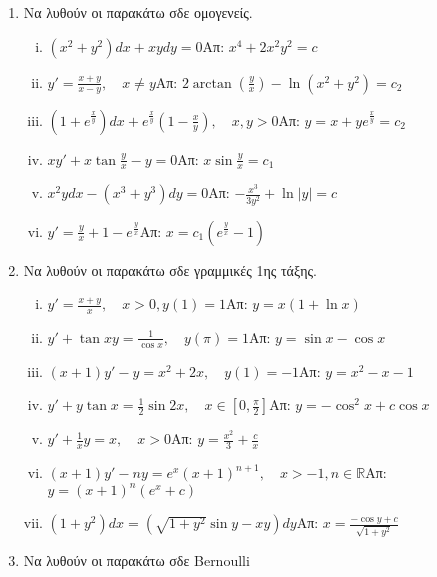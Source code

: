 \documentclass[a4paper,12pt]{article}
\begin{document}
\begin{enumerate}
\begin{enumerate}[i)]
\end{enumerate}


\item Να λυθούν οι παρακάτω σδε ομογενείς.

\begin{enumerate}[i)]

\item $(x^2+y^2)dx+xydy=0$\hfill Απ: $x^4+2x^2y^2=c$
\item $y'=\frac{x+y}{x-y}, \quad x\neq y$\hfill Απ: $2\arctan (\frac{y}{x})-\ln (x^2+y^2)=c_2$
\item $(1+e^{\frac{x}{y}})dx+e^{\frac{x}{y}}(1-\frac{x}{y}), \quad x,y>0$\hfill Απ: $y=x+ye^{\frac{x}{y}}=c_2$
\item $xy'+x\tan \frac{y}{x}-y=0$\hfill Απ: $x\sin \frac{y}{x}=c_1$
\item $x^2ydx-(x^3+y^3)dy=0$\hfill Απ: $-\frac{x^3}{3y^2}+\ln|y|=c$
\item $y'=\frac{y}{x}+1-e^{\frac{y}{x}}$\hfill Απ: $x=c_1(e^{\frac{y}{x}}-1)$

\end{enumerate}

\item Να λυθούν οι παρακάτω σδε γραμμικές 1ης τάξης.

\begin{enumerate}[i)]

\item $y'=\frac{x+y}{x}, \quad x>0, y(1)=1$\hfill Απ: $y=x(1+\ln x)$
\item $y'+\tan x y=\frac{1}{\cos x}, \quad y(\pi)=1$\hfill Απ: $y=\sin x-\cos x$
\item $(x+1)y'-y=x^2+2x, \quad y(1)=-1$\hfill Απ: $y=x^2-x-1$
\item $y'+y\tan x=\frac{1}{2}\sin 2x, \quad x\in [0,\frac{\pi}{2}]$\hfill Απ: $y=-\cos^2 x+c\cos x$
\item $y'+\frac{1}{x}y=x, \quad x>0$\hfill Απ: $y=\frac{x^2}{3}+\frac{c}{x}$
\item $(x+1)y'-ny=e^x(x+1)^{n+1}, \quad x>-1, n\in \mathbb{R}$\hfill Απ: $y=(x+1)^n(e^x+c)$
\item $(1+y^2)dx=(\sqrt{1+y^2}\sin y-xy)dy$\hfill Απ: $x=\frac{-\cos y+c}{\sqrt{1+y^2}}$

\end{enumerate}

\item Να λυθούν οι παρακάτω σδε \textlatin{Bernoulli}

\begin{enumerate}[i)]


\end{enumerate}
\end{enumerate}
\end{document}
